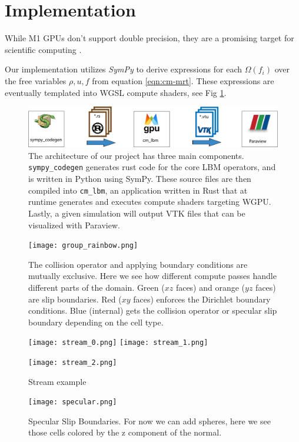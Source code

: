 \section{Implementation}\label{sec:implementation}
While M1 GPUs don't support double precision, 
they are a promising target for scientific computing \cite{Kenyon2022}.

Our implementation utilizes \textit{SymPy} to derive expressions for each $\Omega(f_i)$ over the free variables $\rho, u, f$ from equation \ref{eqn:cm-mrt}. These expressions are eventually templated into WGSL compute shaders, see Fig \ref{fig:architecture}.

\begin{figure}
\begin{center}
\includegraphics[width=0.8\linewidth]{workflow.png}
\end{center}
  \caption{The architecture of our project has three main components.
  \lstinline{sympy_codegen} generates rust code 
  for the core LBM operators, and is written in Python using SymPy.
  These source files are then compiled into \lstinline{cm_lbm},
  an application written in Rust that at runtime generates and 
  executes compute shaders targeting WGPU.
  Lastly, a given simulation will output VTK files that can be
  visualized with Paraview.
}
  \label{fig:architecture}
\end{figure}

\begin{figure}
  \begin{center}
    \texttt{[image: group\_rainbow.png]}
  \end{center}
  \caption{The collision operator and applying boundary conditions are mutually exclusive.
  Here we see how different compute passes handle different parts of the domain.
Green ($xz$ faces) and orange ($yz$ faces) are slip boundaries.
Red ($xy$ faces) enforces the Dirichlet boundary conditions.
Blue (internal) gets the collision operator or specular slip boundary 
depending on the cell type.}
\end{figure}

\begin{figure}
  \begin{center}
    \texttt{[image: stream\_0.png]}
    \texttt{[image: stream\_1.png]}

    \texttt{[image: stream\_2.png]}
  \end{center}
  \caption{Stream example}
\end{figure}

\begin{figure}
  \begin{center}
    \texttt{[image: specular.png]}
  \end{center}
  \caption{Specular Slip Boundaries.
For now we can add spheres, here we see those cells colored by the z component of the normal.}
\end{figure}
